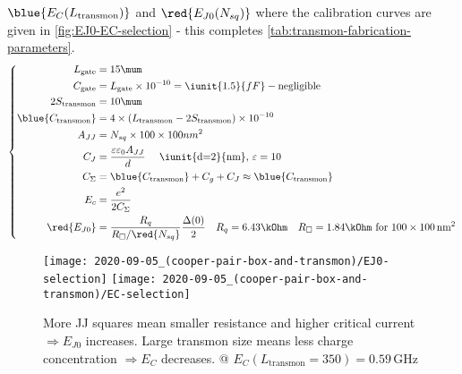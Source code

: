 \begin{framed}\noindent
  $\blue{E_C(L_{\text{transmon}})}$ and $\red{E_{J0}(N_{sq})}$ where the
  calibration curves are given  in \autoref{fig:EJ0-EC-selection} - this
  completes \autoref{tab:transmon-fabrication-parameters}.
  \begin{equation}
    \left\{
      \begin{aligned}
        L_\text{gate} & = 15\mum\\
        C_{\text{gate}} & = L_\text{gate} \times 10^{-10} = \iunit{1.5}{fF} - \text{negligible}\\
        2S_{\text{transmon}} & = 10\mum \\
        \blue{C_{\text{transmon}}} & = 4\times\left( L_{\text{transmon}} - 2S_{\text{transmon}} \right) \times 10^{-10} \\
        A_{JJ} &  = N_{sq} \times 100\times100nm^{2} \\
        C_J & = \frac{\varepsilon\varepsilon_0A_{JJ}}{d} \quad \text{
          \iunit{d=2}{nm}, $\varepsilon = 10$}\\
        C_{\Sigma} & = \blue{C_\text{transmon}} + C_g + C_J \approx \blue{C_\text{transmon}}\\
        E_c& = \frac{e^2}{2C_\Sigma}\\
        \red{E_{J0}} & = \frac{R_q}{R_{\square}/\red{N_{sq}}}\frac{\Delta(0)}{2} \quad R_q=6.43\kOhm \quad R_{\square} = 1.84\kOhm \text{ for } 100 \times 100\,\text{nm}^2\\
      \end{aligned}\right.
  \end{equation}
\end{framed}

\begin{figure}[h]
  \centering%
  \texttt{[image: 2020-09-05\_(cooper-pair-box-and-transmon)/EJ0-selection]}%
  \texttt{[image: 2020-09-05\_(cooper-pair-box-and-transmon)/EC-selection]}
  \caption{\small  More JJ  squares mean  smaller resistance  and higher
    critical  current $\Rightarrow  E_{J0}$  increases.  Large  transmon
    size means less charge  concentration $\Rightarrow E_{C}$ decreases.
    @
    $E_C(L_{\text{transmon}}=350)                                      =
    0.59\,$GHz\label{fig:EJ0-EC-selection}}
\end{figure}

